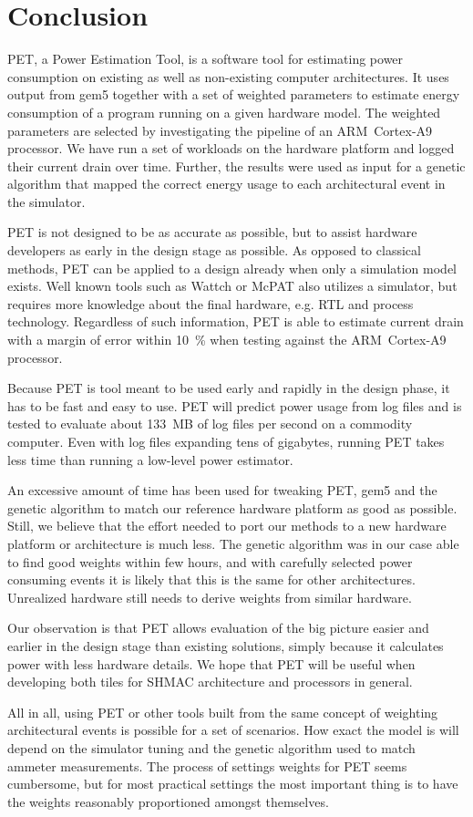 \section{Conclusion}

PET, a Power Estimation Tool, is a software tool for estimating power
consumption on existing as well as non-existing computer architectures. It uses
output from gem5 together with a set of weighted parameters to estimate energy
consumption of a program running on a given hardware model. The weighted
parameters are selected by investigating the pipeline of an ARM~Cortex-A9
processor. We have run a set of workloads on the hardware platform and logged
their current drain over time. Further, the results were used as input for a
genetic algorithm that mapped the correct energy usage to each architectural
event in the simulator.

PET is not designed to be as accurate as possible, but to assist hardware
developers as early in the design stage as possible. As opposed to classical
methods, PET can be applied to a design already when only a simulation model
exists. Well known tools such as Wattch \cite{brooks2000wattch} or McPAT
\cite{li2009mcpat,li2013mcpat} also utilizes a simulator, but requires more knowledge about
the final hardware, e.g. RTL and process technology. Regardless of such
information, PET is able to estimate current drain with a margin of error within
10~\% when testing against the ARM~Cortex-A9 processor.

Because PET is tool meant to be used early and rapidly in the design phase, it
has to be fast and easy to use. PET will predict power usage from log files and
is tested to evaluate about 133~MB of log files per second on a commodity
computer. Even with log files expanding tens of gigabytes, running PET takes
less time than running a low-level power estimator.

An excessive amount of time has been used for tweaking PET, gem5 and the genetic
algorithm to match our reference hardware platform as good as possible. Still,
we believe that the effort needed to port our methods to a new hardware platform
or architecture is much less. The genetic algorithm was in our case able to find
good weights within few hours, and with carefully selected power consuming
events it is likely that this is the same for other architectures. Unrealized
hardware still needs to derive weights from similar hardware.

Our observation is that PET allows evaluation of the big picture easier and
earlier in the design stage than existing solutions, simply because it
calculates power with less hardware details. We hope that PET will be useful
when developing both tiles for SHMAC architecture and processors in general.

All in all, using PET or other tools built from the same concept of weighting
architectural events is possible for a set of scenarios. How exact the model is
will depend on the simulator tuning and the genetic algorithm used to match
ammeter measurements. The process of settings weights for PET seems cumbersome,
but for most practical settings the most important thing is to have the weights
reasonably proportioned amongst themselves.

